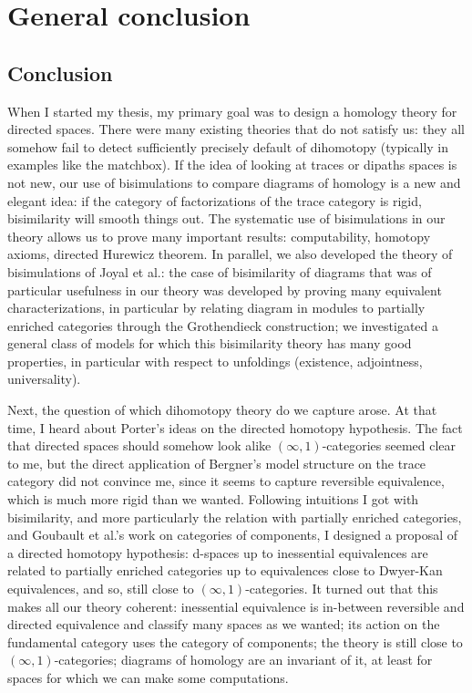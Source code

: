 \chapter*{General conclusion}

\section*{Conclusion}

When I started my thesis, my primary goal was to design a homology theory for directed spaces. There were many existing theories that do not satisfy us: they all somehow fail to detect sufficiently precisely default of dihomotopy (typically in examples like the matchbox). If the idea of looking at traces or dipaths spaces is not new, our use of bisimulations to compare diagrams of homology is a new and elegant idea: if the category of factorizations of the trace category is rigid, bisimilarity will smooth things out. The systematic use of bisimulations in our theory allows us to prove many important results: computability, homotopy axioms, directed Hurewicz theorem. In parallel, we also developed the theory of bisimulations of Joyal et al.: the case of bisimilarity of diagrams that was of particular usefulness in our theory was developed by proving many equivalent characterizations, in particular by relating diagram in modules to partially enriched categories through the Grothendieck construction; we investigated a general class of models for which this bisimilarity theory has many good properties, in particular with respect to unfoldings (existence, adjointness, universality).

Next, the question of which dihomotopy theory do we capture arose. At that time, I heard about Porter's ideas on the directed homotopy hypothesis. The fact that directed spaces should somehow look alike $(\infty,1)$-categories seemed clear to me, but the direct application of Bergner's model structure on the trace category did not convince me, since it seems to capture reversible equivalence, which is much more rigid than we wanted. Following intuitions I got with bisimilarity, and more particularly the relation with partially enriched categories, and Goubault et al.'s work on categories of components, I designed a proposal of a directed homotopy hypothesis: d-spaces up to inessential equivalences are related to partially enriched categories up to equivalences close to Dwyer-Kan equivalences, and so, still close to $(\infty,1)$-categories. It turned out that this makes all our theory coherent: inessential equivalence is in-between reversible and directed equivalence and classify many spaces as we wanted; its action on the fundamental category uses the category of components; the theory is still close to $(\infty,1)$-categories; diagrams of homology are an invariant of it, at least for spaces for which we can make some computations.

